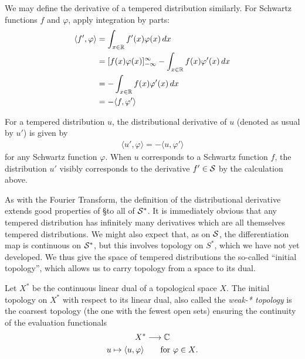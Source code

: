   We may define the derivative of a tempered distribution similarly.
  For Schwartz functions $f$ and $\varphi$, apply integration by parts:
  \begin{align*}
    \langle f', \varphi\rangle
    &= \int_{x\in\R} f'(x)\varphi(x)\,dx
    \\&= [f(x)\varphi(x)]_{-\infty}^\infty -\int_{x\in\R} f(x)\varphi'(x)\,dx
    \\&= -\int_{x\in\R} f(x)\varphi'(x)\,dx
    \\&= -\langle f,\varphi'\rangle
  \end{align*}
  \begin{defn}
    For a tempered distribution $u$, the distributional derivative of $u$ (denoted as usual by $u'$) is given by
    \begin{align*}
      \langle u', \varphi\rangle = -\langle u, \varphi'\rangle
    \end{align*}
    for any Schwartz function $\varphi$.
    When $u$ corresponds to a Schwartz function $f$, the distribution $u'$ visibly corresponds to the derivative $f'\in\S$ by the calculation above. 
  \end{defn}
  
  As with the Fourier Transform, the definition of the distributional derivative extends good properties of \S to all of $\S^*$.
  It is immediately obvious that any tempered distribution has infinitely many derivatives which are all themselves tempered distributions.
  We might also expect that, as on $\S$, the differentiation map is continuous on $\S^*$, but this involves topology on $S^*$, which we have not yet developed.
  We thus give the space of tempered distributions the so-called ``initial topology'', which allows us to carry topology from a space to its dual.
  \begin{defn}
    Let $X^*$ be the continuous linear dual of a topological space $X$.
    The initial topology on $X^*$ with respect to its linear dual, also called the \emph{weak-* topology} is the coarsest topology (the one with the fewest open sets) ensuring the continuity of the evaluation functionals
    \begin{gather*}
      X^*\longrightarrow\C\\
      u\mapsto \langle u,\varphi\rangle\qquad\text{for }\varphi\in X\text{.}
    \end{gather*}
  \end{defn}

